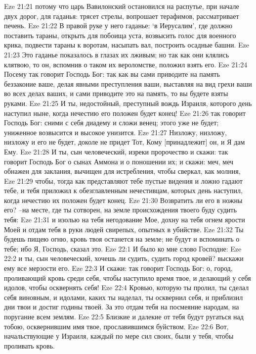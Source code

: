 Eze 21:21  потому что царь Вавилонский остановился на распутье, при начале двух дорог, для гаданья: трясет стрелы, вопрошает терафимов, рассматривает печень.
Eze 21:22  В правой руке у него гаданье: `в Иерусалим', где должно поставить тараны, открыть для побоища уста, возвысить голос для военного крика, подвести тараны к воротам, насыпать вал, построить осадные башни.
Eze 21:23  Это гаданье показалось в глазах их лживым; но так как они клялись клятвою, то он, вспомнив о таком их вероломстве, положил взять его.
Eze 21:24  Посему так говорит Господь Бог: так как вы сами приводите на память беззаконие ваше, делая явными преступления ваши, выставляя на вид грехи ваши во всех делах ваших, и сами приводите это на память, то вы будете взяты руками.
Eze 21:25  И ты, недостойный, преступный вождь Израиля, которого день наступил ныне, когда нечестию его положен будет конец!
Eze 21:26  так говорит Господь Бог: сними с себя диадему и сложи венец; этого уже не будет; униженное возвысится и высокое унизится.
Eze 21:27  Низложу, низложу, низложу и его не будет, доколе не придет Тот, Кому [принадлежит] он, и Я дам Ему.
Eze 21:28  И ты, сын человеческий, изреки пророчество и скажи: так говорит Господь Бог о сынах Аммона и о поношении их; и скажи: меч, меч обнажен для заклания, вычищен для истребления, чтобы сверкал, как молния,
Eze 21:29  чтобы, тогда как представляют тебе пустые видения и ложно гадают тебе, и тебя приложил к обезглавленным нечестивцам, которых день наступил, когда нечестию их положен будет конец.
Eze 21:30  Возвратить ли его в ножны его? --на месте, где ты сотворен, на земле происхождения твоего буду судить тебя:
Eze 21:31  и изолью на тебя негодование Мое, дохну на тебя огнем ярости Моей и отдам тебя в руки людей свирепых, опытных в убийстве.
Eze 21:32  Ты будешь пищею огню, кровь твоя останется на земле; не будут и вспоминать о тебе; ибо Я, Господь, сказал это.
Eze 22:1  И было ко мне слово Господне:
Eze 22:2  и ты, сын человеческий, хочешь ли судить, судить город кровей? выскажи ему все мерзости его.
Eze 22:3  И скажи: так говорит Господь Бог: о, город, проливающий кровь среди себя, чтобы наступило время твое, и делающий у себя идолов, чтобы осквернять себя!
Eze 22:4  Кровью, которую ты пролил, ты сделал себя виновным, и идолами, каких ты наделал, ты осквернил себя, и приблизил дни твои и достиг годины твоей. За это отдам тебя на посмеяние народам, на поругание всем землям.
Eze 22:5  Близкие и далекие от тебя будут ругаться над тобою, осквернившим имя твое, прославившимся буйством.
Eze 22:6  Вот, начальствующие у Израиля, каждый по мере сил своих, были у тебя, чтобы проливать кровь.
